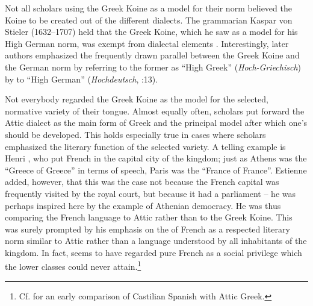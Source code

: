 Not all scholars using the Greek Koine as a model for their  norm believed the Koine to be created out of the different dialects. The grammarian Kaspar von Stieler (1632–1707) held that the Greek Koine, which he saw as a model for his High German norm, was exempt from dialectal elements \citep[2]{Stieler1691}. Interestingly, later authors emphasized the frequently drawn parallel between the Greek Koine and the German norm by referring to the former as “High Greek” (\textit{Hoch-Griechisch}) by  to “High German” (\textit{Hochdeutsch}, \citealt{Schuster1737}:13).

Not everybody regarded the Greek Koine as the model for the selected, normative variety of their  tongue. Almost equally often, scholars put forward the Attic dialect as the main form of Greek and the principal model after which one’s  should be developed. This holds especially true in cases where scholars emphasized the literary function of the selected variety. A telling example is Henri \citet[*.iii\textsc{\textsuperscript{v}}]{Estienne1582}, who put French in the capital city of the kingdom; just as Athens was the “Greece of Greece” in terms of speech, Paris was the “France of France”. Estienne added, however, that this was the case not because the French capital was frequently visited by the royal court, but because it had a parliament – he was perhaps inspired here by the example of Athenian democracy. He was thus comparing the French language to Attic rather than to the Greek Koine. This was surely prompted by his emphasis on the  of French as a respected literary norm similar to Attic rather than a language understood by all inhabitants of the kingdom. In fact, \citet[*.iii\textsc{\textsuperscript{r}}]{Estienne1582} seems to have regarded pure French as a social privilege which the lower classes could never attain.\footnote{Cf. \citet[\textsc{xxxiii}\textsc{\textsuperscript{v}}]{Marineo1497} for an early comparison of Castilian Spanish with Attic Greek.}

